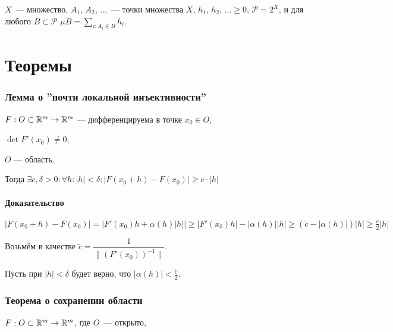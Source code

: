 \documentclass{article}
\begin{document}
        $X$~--- множество, $A_1$, $A_2$, $\ldots$~--- точки множества $X$, $h_1$, $h_2$, $\ldots \geq 0$, $\mathcal{P} = 2^X$, и для любого $B \subset \mathcal{P}$ $\mu B = \sum\limits_{i : A_i \in B} h_i$.
        
\newpage

\part{Теоремы}

    \newpage
    
    \section{Лемма о ''почти локальной инъективности''}
    
        $F : O \subset \mathbb{R}^m \rightarrow \mathbb{R}^m$ --- дифференцируема в точке $x_0 \in O$, 
        
        $\det F'(x_0) \neq 0$,
        
        $O$ --- область.
        
        Тогда $\exists c, \delta > 0 : \forall h : \left| h \right| < \delta : \left| F(x_0 + h) - F(x_0) \right| \geq c \cdot \left| h \right|$
        
        \subsection{Доказательство}
        
            $\left| F(x_0 + h) - F(x_0) \right| = \left| F'(x_0)h + \alpha(h) \left| h \right| \right| \geq \left| F'(x_0) h \right| - \left| \alpha(h) \right| \left| h \right| \geq (\widetilde{c} - \left| \alpha(h) \right|) \left| h \right| \geq \frac{c}{2} \left| h \right|$
        
            Возьмём в качестве $\widetilde{c} = \dfrac{1}{\| (F'(x_0))^{-1} \|}$.
        
            Пусть при $|h| < \delta$ будет верно, что $\left| \alpha(h) \right| < \frac{\widetilde{c}}{2}$.
        
    \newpage
    
    \section{Теорема о сохранении области}
    
        $F : O \subset \mathbb{R}^m \rightarrow \mathbb{R}^m$, где $O$~--- открыто,
        
\end{document}
